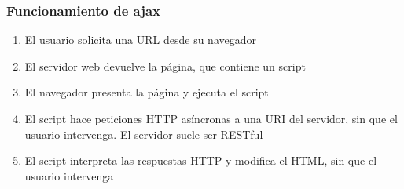 \documentclass[ucs]{beamer}
\begin{document}
\begin{frame}[fragile]
\frametitle{Funcionamiento de ajax}
\begin{enumerate}
\item
El usuario solicita una URL desde su navegador

\item
El servidor web devuelve la página, que contiene un script

\item
El navegador presenta la página y ejecuta el script

\item
El script hace peticiones HTTP asíncronas a una URI del servidor, sin que
el usuario intervenga. El servidor suele ser RESTful

\item
El script interpreta las respuestas HTTP y modifica el HTML, sin que
el usuario intervenga
\end{enumerate}

\end{frame}
\end{document}
